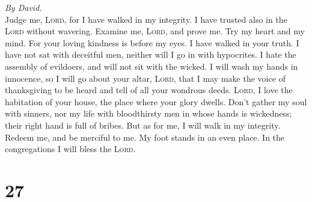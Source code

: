 \emph{By David.}\\
 Judge me, \textsc{Lord}, for I have walked in my
integrity. I have trusted also in the \textsc{Lord} without wavering.
 Examine me, \textsc{Lord}, and prove me. Try my heart and
my mind.  For your loving kindness is before my eyes. I
have walked in your truth.  I have not sat with deceitful
men, neither will I go in with hypocrites.  I hate the
assembly of evildoers, and will not sit with the wicked. 
I will wash my hands in innocence, so I will go about your altar,
\textsc{Lord},  that I may make the voice of thanksgiving
to be heard and tell of all your wondrous deeds. 
\textsc{Lord}, I love the habitation of your house, the place where your
glory dwells.  Don't gather my soul with sinners, nor my
life with bloodthirsty men  in whose hands is wickedness;
their right hand is full of bribes.  But as for me, I
will walk in my integrity. Redeem me, and be merciful to me.
 My foot stands in an even place. In the congregations I
will bless the \textsc{Lord}.

\hypertarget{section-26}{%
\section{27}\label{section-26}}

